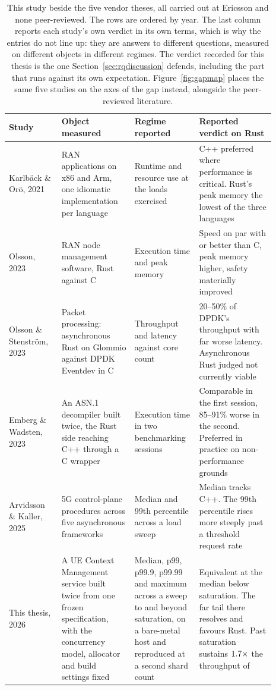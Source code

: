 \documentclass[english,oneside,a4paper,censored,csm,software-track-2020]{HYthesisML}
\renewcommand{\arraystretch}{0.95}
\begin{document}
\begin{appendices}
\begin{table}[tp]
\centering
\small
\caption[This study beside the five vendor theses]{This study beside the five vendor theses, all
carried out at Ericsson and none peer-reviewed. The rows are ordered by year. The last column
reports each study's own verdict in its own terms, which is why the entries do not line up: they
are answers to different questions, measured on different objects in different regimes. The
verdict recorded for this thesis is the one Section~\ref{sec:rqdiscussion} defends, including the
part that runs against its own expectation. Figure~\ref{fig:gapmap} places the same five studies on
the axes of the gap instead, alongside the peer-reviewed
literature.\label{tab:vendortheses}}
\renewcommand{\arraystretch}{1.2}
\begin{tabular}{@{}R{0.18\linewidth} R{0.25\linewidth} R{0.20\linewidth} R{0.26\linewidth}@{}}
\hline\hline
Study & Object measured & Regime reported & Reported verdict on Rust \\
\hline
Karlb\"ack \& Or\"o, 2021~\cite{karlback2021ran} &
RAN applications on x86 and Arm, one idiomatic implementation per language &
Runtime and resource use at the loads exercised &
C++ preferred where performance is critical. Rust's peak memory the lowest of the three
languages \\
Olsson, 2023~\cite{olsson2023ranmgmt} &
RAN node management software, Rust against C &
Execution time and peak memory &
Speed on par with or better than C, peak memory higher, safety materially improved \\
Olsson \& Stenstr\"om, 2023~\cite{olsson2023asyncpackets} &
Packet processing: asynchronous Rust on Glommio against DPDK Eventdev in C &
Throughput and latency against core count &
20--50\% of DPDK's throughput with far worse latency. Asynchronous Rust judged not currently
viable \\
Emberg \& Wadsten, 2023~\cite{emberg2023asn1} &
An {ASN.1} decompiler built twice, the Rust side reaching C++ through a C wrapper &
Execution time in two benchmarking sessions &
Comparable in the first session, 85--91\% worse in the second. Preferred in practice on
non-performance grounds \\
Arvidsson \& Kaller, 2025~\cite{arvidsson2025async} &
5G control-plane procedures across five asynchronous frameworks &
Median and 99th percentile across a load sweep &
Median tracks C++. The 99th percentile rises more steeply past a threshold request rate \\
\hline
This thesis, 2026 &
A UE Context Management service built twice from one frozen specification, with the concurrency
model, allocator and build settings fixed &
Median, p99, p99.9, p99.99 and maximum across a sweep to and beyond saturation, on a bare-metal
host and reproduced at a second shard count &
Equivalent at the median below saturation. The far tail there resolves and favours Rust. Past
saturation \OverloadSustainedFaster{} sustains
$1.7\times$ the throughput of \OverloadSustainedSlower{} \\
\hline
\end{tabular}
\end{table}


\end{appendices}
\end{document}

